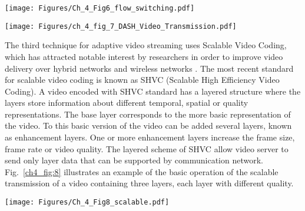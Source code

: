 \begin{center}
\texttt{[image: Figures/Ch\_4\_Fig6\_flow\_switching.pdf]}
\label{ch4_fig:6}       %
\end{center}


\begin{center}
\texttt{[image: Figures/ch\_4\_fig\_7\_DASH\_Video\_Transmission.pdf]}
\label{ch4_fig:7}       %
\end{center}


The third technique for adaptive video streaming uses Scalable Video Coding, which has attracted notable interest by researchers in order to improve video delivery over hybrid networks \cite{castellanos_improving_2018} and wireless networks \cite{castellanos_svceval-ra_2017}. The most recent standard for scalable video coding is known as SHVC (Scalable High Efficiency Video Coding). A video encoded with SHVC standard has a layered structure where the layers store information about different temporal, spatial or quality representations. The base layer corresponds to the more basic representation of the video. To this basic version of the video can be added several layers, known as enhancement layers. One or more enhancement layers increase the frame size, frame rate or video quality. The layered scheme of SHVC allow video server to send only layer data that can be supported by communication network. Fig.~\ref{ch4_fig:8} illustrates an example of the basic operation of the scalable transmission of a video containing three layers, each layer with different quality.

\begin{center}
\texttt{[image: Figures/Ch\_4\_Fig8\_scalable.pdf]}
\label{ch4_fig:8}       %
\end{center}

